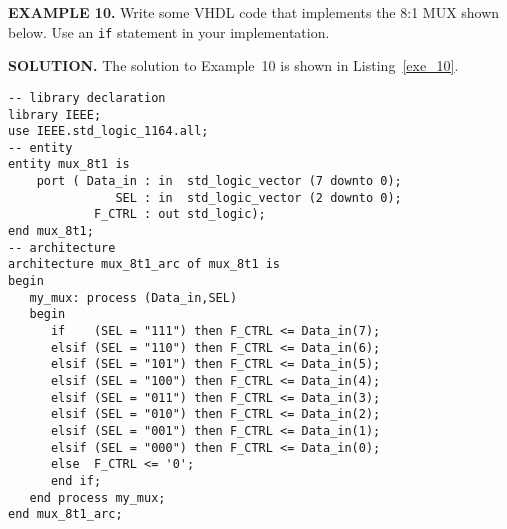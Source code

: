 \begin{leftbar}
\noindent
\begin{minipage}{0.45\linewidth}
\textbf{EXAMPLE 10.}
Write some VHDL code that implements the 8:1 MUX shown below. Use an \texttt{if} statement in your implementation.\\
\end{minipage}
\begin{minipage}{0.5\linewidth}
\begin{flushright}
\end{flushright}
\end{minipage}

\end{leftbar}
\noindent
\textbf{SOLUTION.} The solution to Example~10 is shown in Listing~\ref{exe_10}.

\noindent
\begin{minipage}{0.99\linewidth}
\begin{lstlisting}[label=exe_10, caption=Solution to Example~10.]
-- library declaration
library IEEE;
use IEEE.std_logic_1164.all;
-- entity
entity mux_8t1 is
    port ( Data_in : in  std_logic_vector (7 downto 0);
               SEL : in  std_logic_vector (2 downto 0);
            F_CTRL : out std_logic);
end mux_8t1;
-- architecture
architecture mux_8t1_arc of mux_8t1 is
begin
   my_mux: process (Data_in,SEL)
   begin
      if    (SEL = "111") then F_CTRL <= Data_in(7);
      elsif (SEL = "110") then F_CTRL <= Data_in(6);
      elsif (SEL = "101") then F_CTRL <= Data_in(5);
      elsif (SEL = "100") then F_CTRL <= Data_in(4);
      elsif (SEL = "011") then F_CTRL <= Data_in(3);
      elsif (SEL = "010") then F_CTRL <= Data_in(2);
      elsif (SEL = "001") then F_CTRL <= Data_in(1);
      elsif (SEL = "000") then F_CTRL <= Data_in(0);
      else  F_CTRL <= '0';
      end if;
   end process my_mux;
end mux_8t1_arc;
\end{lstlisting}
\end{minipage}

